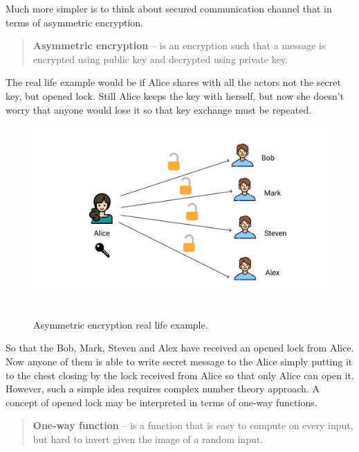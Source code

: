 \documentclass[12pt,letterpaper,oneside,reqno]{amsart}
\begin{document}
    Much more simpler is to think about secured communication channel that in terms of asymmetric encryption.
    \begin{quote}
        \textbf{Asymmetric encryption} -- is an encryption such that a message is encrypted using public key and
        decrypted using private key.
    \end{quote}
    The real life example would be if Alice shares with all the actors not the secret key, but opened lock.
    Still Alice keeps the key with herself, but now she doesn't worry that anyone would lose it so that key exchange must be repeated.
    \begin{figure}[H]
        \centering
        \includegraphics[width=1\textwidth]{Asymmetric_encryption}
        ~\caption{Asymmetric encryption real life example.}\label{fig:figure2}
    \end{figure}
    So that the Bob, Mark, Steven and Alex have received an opened lock from Alice.
    Now anyone of them is able to write secret message to the Alice simply putting it to the chest closing by the lock
    received from Alice so that only Alice can open it.
    However, such a simple idea requires complex number theory approach.
    A concept of opened lock may be interpreted in terms of one-way functions.
    \begin{quote}
        \textbf{One-way function} -- is a function that is easy to compute on every input, but hard to invert given the image of
        a random input.
    \end{quote}
\end{document}

